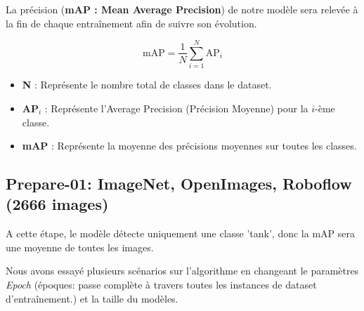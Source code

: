 La précision (\textbf{mAP : Mean Average Precision}) de notre modèle sera relevée à la fin de chaque entraînement afin de suivre son évolution.

\begin{equation}
    \mathrm{mAP} = \frac{1}{N} \sum_{i=1}^{N} \mathrm{AP}_i
\end{equation}

\begin{itemize}
    \item \textbf{N} : Représente le nombre total de classes dans le dataset.
    \item \textbf{AP$_i$} : Représente l'Average Precision (Précision Moyenne) pour la $i$-ème classe.
    \item \textbf{mAP} : Représente la moyenne des précisions moyennes sur toutes les classes.
\end{itemize}



\subsection*{Prepare-01: ImageNet, OpenImages, Roboflow (2666 images)}

A cette étape, le modèle détecte uniquement une classe 'tank', donc la mAP sera une moyenne de toutes les images.

Nous avons essayé plusieurs scénarios sur l’algorithme en changeant le paramètres \textit{Epoch} (époques: passe complète à travers toutes les instances de dataset d'entraînement.) et la taille du modèles.


